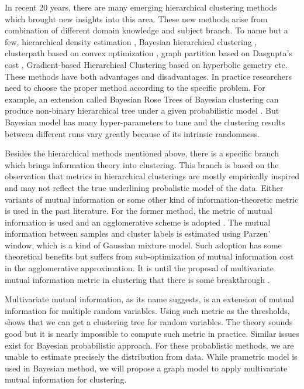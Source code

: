 In recent 20 years, there are many emerging hierarchical clustering methods which brought new insights into this area. These new methods arise from combination of different domain knowledge and
subject branch. To name but a few, hierarchical density estimation \citep{hde}, Bayesian hierarchical clustering \citep{bhc},
clusterpath based on convex optimization \citep{hocking2011clusterpath},
graph partition based on Dasgupta's cost \citep{dasgupta2016cost},
Gradient-based Hierarchical Clustering based on hyperbolic gemetry \citep{hyperbolic} etc.
These methods have both advantages and disadvantages.
In practice researchers need to choose the proper method according to the specific problem.
For example, an extension called Bayesian Rose Trees of Bayesian clustering
can produce non-binary hierarchical tree
under a given probabilistic model \citep{blundell2011discovering}.
But Bayesian model has many hyper-parameters to tune and the clustering results between different runs vary greatly because of its intrinsic randomness.


Besides the hierarchical methods mentioned above, there is a specific branch which brings information theory into clustering. This branch is based on the observation that metrics in hierarchical clusterings
are mostly empirically inspired and may not reflect the true underlining probalistic model of the data.
Either variants of mutual information or some other kind of information-theoretic metric \citep{ic2002}  is used in the past literature. For the former method, the metric of mutual information is used and an agglomerative scheme is adopted \citep{mim}. The mutual information between samples and cluster labels is estimated using Parzen' window, which is a kind of Gaussian mixture model. Such adoption
has some theoretical benefits but suffers from sub-optimization of mutual information cost in the agglomerative approximation. It is until the proposal of multivariate mutual information metric in clustering that there is some breakthrough \citep{ic2016}.

Multivariate mutual information, as its name suggests, is an extension of mutual information for multiple
random variables. Using such metric as the thresholds, \citet{ic2016} shows that we can get a clustering
tree for random variables. The theory sounds good but it is nearly impossible to compute such metric
in practice. Similar issues exist for Bayesian probabilistic approach. For these probablistic methods, we
are unable to estimate precisely the distribution from data. While prametric model is used in Bayesian
method, we will propose a graph model to apply multivariate mutual information for clustering.

